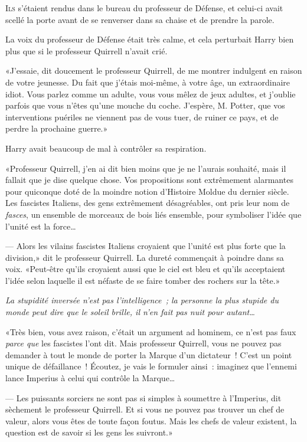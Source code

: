 
\lettrine{I}{ls} s'étaient rendus dans le bureau du professeur de Défense, et celui-ci avait scellé la porte avant de se renverser dans sa chaise et de prendre la parole.

La voix du professeur de Défense était très calme, et cela perturbait Harry bien plus que si le professeur Quirrell n'avait crié.

«J'essaie, dit doucement le professeur Quirrell, de me montrer indulgent en raison de votre jeunesse. Du fait que j'étais moi-même, à votre âge, un extraordinaire idiot. Vous parlez comme un adulte, vous vous mêlez de jeux adultes, et j'oublie parfois que vous n'êtes qu'une mouche du coche. J'espère, M. Potter, que vos interventions puériles ne viennent pas de vous tuer, de ruiner ce pays, et de perdre la prochaine guerre.»

Harry avait beaucoup de mal à contrôler sa respiration.

«Professeur Quirrell, j'en ai dit bien moins que je ne l'aurais souhaité, mais il fallait que je dise quelque chose. Vos propositions sont extrêmement alarmantes pour quiconque doté de la moindre notion d'Histoire Moldue du dernier siècle. Les fascistes Italiens, des gens extrêmement désagréables, ont pris leur nom de \emph{fasces}, un ensemble de morceaux de bois liés ensemble, pour symboliser l'idée que l'unité est la force…

--- Alors les vilains fascistes Italiens croyaient que l'unité est plus forte que la division,» dit le professeur Quirrell. La dureté commençait à poindre dans sa voix. «Peut-être qu'ils croyaient aussi que le ciel est bleu et qu'ils acceptaient l'idée selon laquelle il est néfaste de se faire tomber des rochers sur la tête.»

\emph{La stupidité inversée n'est pas l'intelligence~; la personne la plus stupide du monde peut dire que le soleil brille, il n'en fait pas nuit pour autant…}

«Très bien, vous avez raison, c'était un argument ad hominem, ce n'est pas faux \emph{parce que} les fascistes l'ont dit. Mais professeur Quirrell, vous ne pouvez pas demander à tout le monde de porter la Marque d'un dictateur~! C'est un point unique de défaillance~! Écoutez, je vais le formuler ainsi~: imaginez que l'ennemi lance Imperius à celui qui contrôle la Marque…

--- Les puissants sorciers ne sont pas si simples à soumettre à l'Imperius, dit sèchement le professeur Quirrell. Et si vous ne pouvez pas trouver un chef de valeur, alors vous êtes de toute façon foutus. Mais les chefs de valeur existent, la question est de savoir si les gens les suivront.»

